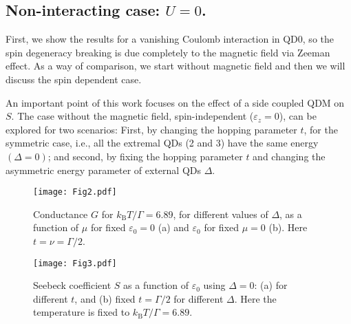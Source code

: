 \documentclass[aps,twocolumn,prb,superscript,floatfix,superscriptaddress,showpacs]{revtex4-1}
\newcommand{\ve}{\varepsilon}
\begin{document}
\subsection{Non-interacting case: $U=0$.}

First, we show the results for a vanishing Coulomb interaction in QD0, so the spin degeneracy breaking is due completely to the magnetic field via Zeeman effect. As a way of comparison, we start without magnetic field and then we will discuss the spin dependent case.

An important point of this work focuses on the effect of a side coupled QDM on $S$. The case without the magnetic field, spin-independent ($\ve_{z}=0$), can be explored for two scenarios: 
First, by changing the hopping parameter $t$, for the symmetric case, i.e., all the extremal QDs (2 and 3) have the same energy $(\Delta=0)$; and second, by fixing the hopping parameter $t$ and changing the asymmetric energy parameter of external QDs $\Delta$.

\begin{figure}[tbph]
\centering
\texttt{[image: Fig2.pdf]}
\caption{Conductance $G$ for $k_{\text{B}}T/\Gamma=6.89$, for different values of $\Delta$, as a function of $\mu$ for fixed $\ve_{0}=0$ (a) and $\ve_{0}$ for fixed $\mu=0$ (b). Here $t=\nu=\Gamma/2$.}
\label{Fig2}
\end{figure}

\begin{figure}[tbph]
\centering
\texttt{[image: Fig3.pdf]}
\caption{Seebeck coefficient $S$ as a function of $\ve_{0}$ using $\Delta=0$: (a) for different $t$, and (b) fixed $t=\Gamma/2$ for different $\Delta$. Here the temperature is fixed to $k_{\text{B}}T/\Gamma=6.89$.}
\label{Fig3}
\end{figure}
\end{document}
